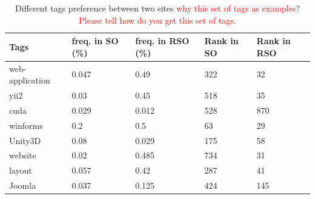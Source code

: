 \begin{table}[!h]
	\scriptsize
	\centering
	\caption{Different tags preference between two sites \textcolor{red}{why this set of tags as examples? Please tell how do you get this set of tags.}}
	\label{tab:table_tagpref}
	\begin{tabular}{|l l l l l|}
		\hline
		{\scriptsize Tags} & freq. in SO (\%) & freq. in RSO (\%) & Rank in SO & Rank in RSO \\
		\hline
		web-application & 0.047 & 0.49 & 322  & 32 \\
		\hline
		yii2 & 0.03 & 0.45 & 518  & 35 \\
		\hline
		cuda & 0.029 & 0.012 & 528 & 870 \\
		\hline
		winforms & 0.2 & 0.5 & 63 & 29 \\
		\hline    
		Unity3D & 0.08 & 0.029 & 175 & 58 \\
		\hline    
		website & 0.02 & 0.485 & 734 & 31 \\
		\hline    
		layout & 0.057 & 0.42 & 287 & 41 \\
		\hline    
		Joomla & 0.037 & 0.125 & 424 & 145 \\
		\hline    
	\end{tabular}
\end{table}	



